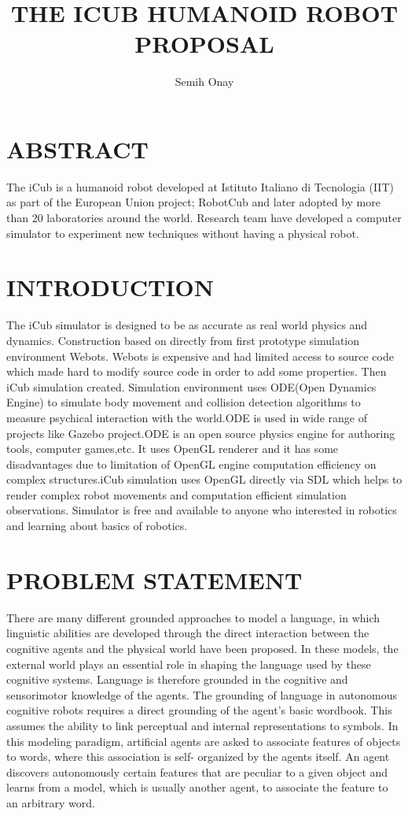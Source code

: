 \documentclass[12pt]{report}
\title{THE ICUB HUMANOID ROBOT \\ PROPOSAL}
\author{Semih Onay}
\begin{document}
\makecstitle

\chapter*{ABSTRACT}
The iCub is a humanoid robot developed at Istituto Italiano di Tecnologia (IIT) as part of the European Union project; RobotCub and later adopted by more than 20 laboratories around the world. Research team have developed a computer simulator to experiment new techniques without having a physical robot.\cite{iCub}

\chapter{INTRODUCTION}
The iCub simulator is designed to be as accurate as real world physics and dynamics. Construction based on directly from first prototype simulation environment Webots\cite{webots}. Webots is expensive and had limited access to source code which made hard to modify source code in order to add some properties. Then iCub simulation created. Simulation environment uses ODE(Open Dynamics Engine)\cite{ode} to simulate body movement and collision detection algorithms to measure psychical interaction with the world.ODE is used in wide range of projects like Gazebo project.\cite{gazebo}ODE is an open source physics engine for authoring tools, computer games,etc. It uses OpenGL renderer and it has some disadvantages due to limitation of OpenGL engine computation efficiency on complex structures.iCub simulation uses OpenGL directly via SDL which helps to render complex robot movements and computation efficient simulation observations.\cite{sdl} Simulator is free and available to anyone who interested in robotics and learning about basics of robotics.\newpage

\chapter{PROBLEM STATEMENT}

There are many different grounded approaches to model a language, in which linguistic abilities are developed through the direct interaction between the cognitive agents and the physical world have been proposed. In these models, the external world plays an essential role in shaping the language used by these cognitive systems. Language is therefore grounded in the cognitive and sensorimotor knowledge of the agents.\cite{cag} The grounding of language in autonomous cognitive robots requires a direct grounding of the agent’s basic wordbook. This assumes the ability to link perceptual and internal representations to symbols. In this modeling paradigm, artificial agents are asked to associate features of objects to words, where this association is self- organized by the agents itself. An agent discovers autonomously certain features that are peculiar to a given object and learns from a model, which is usually another agent, to associate the feature to an arbitrary word.
\end{document}
